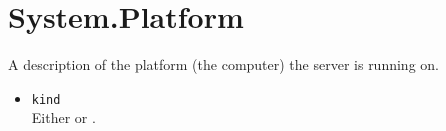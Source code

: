 \section{System.Platform}
A description of the platform (the computer) the server is running on.

\begin{itemize}
\item \lstinline{kind}\\
  Either  or .
\end{itemize}

